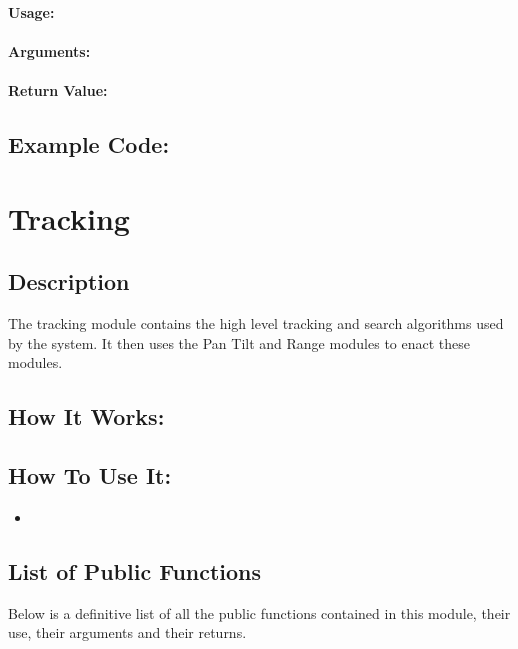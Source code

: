 \documentclass[]{report}
\begin{document}
\subsection{}
\subsubsection{Usage:}

\subsubsection{Arguments:}

\subsubsection{Return Value:}

\section{Example Code:}

\chapter{Tracking}
\section{Description}
The tracking module contains the high level tracking and search algorithms used by the system. It then uses the Pan Tilt and Range modules to enact these modules.

\section{How It Works:}

\section{How To Use It:}
\begin{itemize}
	\item 
\end{itemize}

\section{List of Public Functions}
Below is a definitive list of all the public functions contained in this module, their use, their arguments and their returns.
\end{document}
